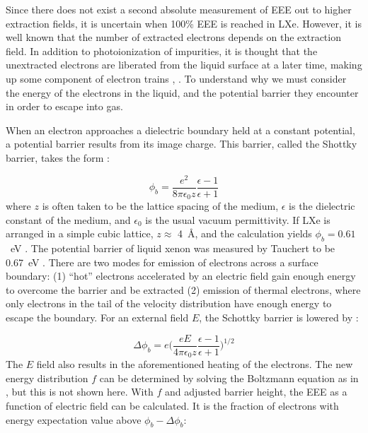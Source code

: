 Since there does not exist a second absolute measurement of \ac{EEE} out to higher extraction fields, it is uncertain when 100\% \ac{EEE} is reached in \ac{LXe}. However, it is well known that the number of extracted electrons depends on the extraction field. In addition to photoionization of impurities, it is thought that the unextracted electrons are liberated from the liquid surface at a later time, making up some component of electron trains \cite{Aprile2014}, \cite{Edwards2018}. To understand why we must consider the energy of the electrons in the liquid, and the potential barrier they encounter in order to escape into gas.

When an electron approaches a dielectric boundary held at a constant potential, a potential barrier results from its image charge. This barrier, called the Shottky barrier, takes the form \cite{Sorensen2017}:

\begin{equation}
\phi_{b} = \frac{e^{2}}{8\pi \epsilon_{0} z} \frac{\epsilon - 1}{\epsilon + 1}
\end{equation}
where $z$ is often taken to be the lattice spacing of the medium, $\epsilon$ is the dielectric constant of the medium, and $\epsilon_{0}$ is the usual vacuum permittivity. If \ac{LXe} is arranged in a simple cubic lattice, $z \approx$ 4~\AA, and the calculation yields $\phi_{b} = 0.61$~eV \cite{Sorensen2017}. The potential barrier of liquid xenon was measured by Tauchert to be 0.67~eV \cite{Tauchert1975}. There are two modes for emission of electrons across a surface boundary: (1) ``hot'' electrons accelerated by an electric field gain enough energy to overcome the barrier and be extracted (2) emission of thermal electrons, where only electrons in the tail of the velocity distribution have enough energy to escape the boundary. For an external field $E$, the Schottky barrier is lowered by \cite{Sorensen2017}:

\begin{equation}
\Delta \phi_{b} = e \Big ( \frac{eE}{4\pi \epsilon_{0} z} \frac{\epsilon - 1}{\epsilon + 1} \Big ) ^{1/2}
\end{equation}
The $E$ field also results in the aforementioned heating of the electrons. The new energy distribution $f$ can be determined by solving the Boltzmann equation as in \cite{Cohen1967}, but this is not shown here. With $f$ and adjusted barrier height, the \ac{EEE} as a function of electric field can be calculated. It is the fraction of electrons with energy expectation value above $\phi_{b} - \Delta\phi_{b}$:

